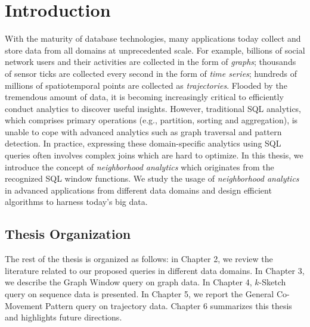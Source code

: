 \chapter{Introduction}
With the maturity of database technologies, many applications today collect and store data from all domains 
at unprecedented scale. For example, billions of 
social network users and their activities are collected in the form
of \emph{graphs}; 
thousands of sensor ticks are collected every second
in the form of \emph{time series}; hundreds of millions of spatiotemporal points
are collected as \emph{trajectories}.
Flooded by the tremendous amount of data, 
it is becoming increasingly critical to efficiently
conduct analytics to discover useful insights.
However, traditional SQL analytics, which comprises 
primary operations (e.g., partition, sorting and aggregation),
is unable to cope with advanced analytics
such as graph traversal and pattern detection. 
In practice, expressing these domain-specific 
analytics using SQL queries often involves 
complex joins which are hard to optimize. 
In this thesis, we introduce the concept of \emph{neighborhood analytics} which
originates from the recognized SQL window functions. We study
the usage of \emph{neighborhood analytics} in advanced applications 
from different data domains
and design efficient algorithms to harness today's big data.

%




 


\section{Thesis Organization}
The rest of the thesis is organized as follows: in Chapter 2, we review the literature related
to our proposed queries in different data domains.
In Chapter 3, we describe the Graph Window query on graph data. 
In Chapter 4, $k$-Sketch query on sequence data is presented.
In Chapter 5, we report the General Co-Movement Pattern query on trajectory data. 
Chapter 6 summarizes this thesis and highlights future directions.

